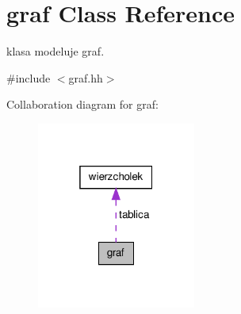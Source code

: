 \hypertarget{classgraf}{\section{graf \-Class \-Reference}
\label{classgraf}
}


klasa modeluje graf.  




{\ttfamily \#include $<$graf.\-hh$>$}



\-Collaboration diagram for graf\-:\nopagebreak
\begin{figure}[H]
\begin{center}
\leavevmode
\includegraphics[width=148pt]{classgraf__coll__graph}
\end{center}
\end{figure}
